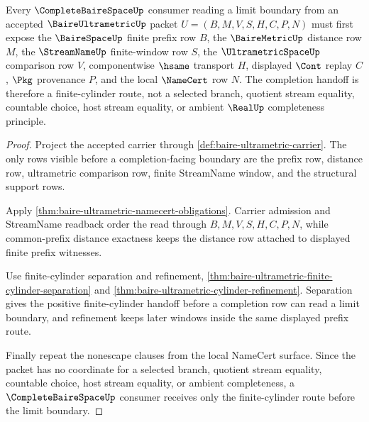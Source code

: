\begin{theorem}\label{thm:baire-ultrametric-finite-cylinder-completion-handoff}
Every $\CompleteBaireSpaceUp$ consumer reading a limit boundary from an accepted $\BaireUltrametricUp$ packet $U=(B,M,V,S,H,C,P,N)$ must first expose the $\BaireSpaceUp$ finite prefix row $B$, the $\BaireMetricUp$ distance row $M$, the $\StreamNameUp$ finite-window row $S$, the $\UltrametricSpaceUp$ comparison row $V$, componentwise $\hsame$ transport $H$, displayed $\Cont$ replay $C$, $\Pkg$ provenance $P$, and the local $\NameCert$ row $N$. The completion handoff is therefore a finite-cylinder route, not a selected branch, quotient stream equality, countable choice, host stream equality, or ambient $\RealUp$ completeness principle.
\end{theorem}
\begin{proof}
Project the accepted carrier through \autoref{def:baire-ultrametric-carrier}. The only rows visible before a completion-facing boundary are the prefix row, distance row, ultrametric comparison row, finite StreamName window, and the structural support rows.

Apply \autoref{thm:baire-ultrametric-namecert-obligations}. Carrier admission and StreamName readback order the read through $B,M,V,S,H,C,P,N$, while common-prefix distance exactness keeps the distance row attached to displayed finite prefix witnesses.

Use finite-cylinder separation and refinement, \autoref{thm:baire-ultrametric-finite-cylinder-separation} and \autoref{thm:baire-ultrametric-cylinder-refinement}. Separation gives the positive finite-cylinder handoff before a completion row can read a limit boundary, and refinement keeps later windows inside the same displayed prefix route.

Finally repeat the nonescape clauses from the local NameCert surface. Since the packet has no coordinate for a selected branch, quotient stream equality, countable choice, host stream equality, or ambient completeness, a $\CompleteBaireSpaceUp$ consumer receives only the finite-cylinder route before the limit boundary.
\end{proof}


